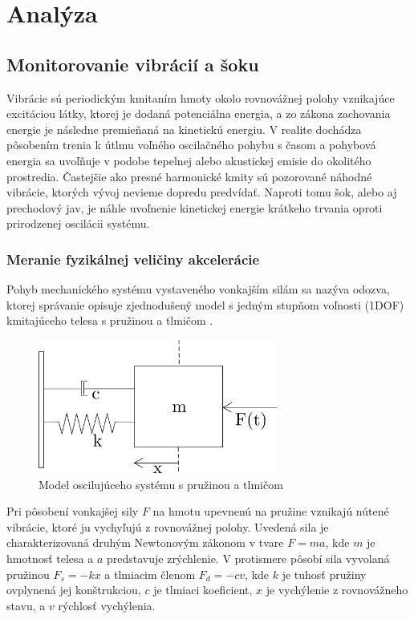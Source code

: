 \chapter{Analýza}

\section{Monitorovanie vibrácií a šoku}
Vibrácie sú periodickým kmitaním hmoty okolo rovnovážnej polohy vznikajúce excitáciou látky, ktorej je dodaná potenciálna energia, a zo
zákona zachovania energie je následne premieňaná na kinetickú energiu. V realite dochádza pôsobením trenia k útlmu voľného oscilačného
pohybu s časom  a pohybová energia sa uvoľňuje v podobe tepelnej alebo akustickej emisie do okolitého prostredia. Častejšie ako presné
harmonické kmity sú pozorované náhodné vibrácie, ktorých vývoj nevieme dopredu predvídať. Naproti tomu šok, alebo aj prechodový jav, je
náhle uvoľnenie kinetickej energie krátkeho trvania oproti prirodzenej oscilácii systému.

\subsection{Meranie fyzikálnej veličiny akcelerácie}
Pohyb mechanického systému vystaveného vonkajším silám sa nazýva odozva, ktorej správanie opisuje zjednodušený model s jedným stupňom
voľnosti (1DOF) kmitajúceho telesa s pružinou a tlmičom \cite{vibrations-shock}.

\begin{figure}[h]
	\centering
	\includegraphics[width=0.7\textwidth]{figures/analysis/mass-spring-damper-model.png}
	\caption{Model oscilujúceho systému s pružinou a tlmičom}
\end{figure}

Pri pôsobení vonkajšej sily $F$ na hmotu upevnenú na pružine vznikajú nútené vibrácie, ktoré ju vychyľujú z rovnovážnej polohy.
Uvedená sila je charakterizovaná druhým Newtonovým zákonom v tvare $F = ma$, kde $m$ je hmotnosť telesa a $a$ predstavuje zrýchlenie.
V protismere pôsobí sila vyvolaná pružinou $F_s = -kx$ a tlmiacim členom $F_d = -cv$, kde $k$ je tuhosť pružiny ovplynená jej konštrukciou,
$c$ je tlmiaci koeficient, $x$ je vychýlenie z rovnovážneho stavu, a $v$ rýchlosť vychýlenia.

